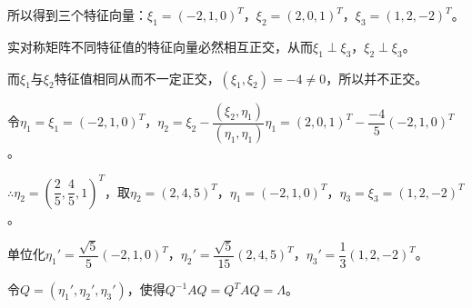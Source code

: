 \documentclass[UTF8, 12pt]{ctexart}
\begin{document}
所以得到三个特征向量：$\xi_1=(-2,1,0)^T$，$\xi_2=(2,0,1)^T$，$\xi_3=(1,2,-2)^T$。

实对称矩阵不同特征值的特征向量必然相互正交，从而$\xi_1\perp\xi_3$，$\xi_2\perp\xi_3$。

而$\xi_1$与$\xi_2$特征值相同从而不一定正交，$(\xi_1,\xi_2)=-4\neq0$，所以并不正交。

令$\eta_1=\xi_1=(-2,1,0)^T$，$\eta_2=\xi_2-\dfrac{(\xi_2,\eta_1)}{(\eta_1,\eta_1)}\eta_1=(2,0,1)^T-\dfrac{-4}{5}(-2,1,0)^T$。

$\therefore\eta_2=\left(\dfrac{2}{5},\dfrac{4}{5},1\right)^T$，取$\eta_2=(2,4,5)^T$，$\eta_1=(-2,1,0)^T$，$\eta_3=\xi_3=(1,2,-2)^T$。

单位化$\eta_1'=\dfrac{\sqrt{5}}{5}(-2,1,0)^T$，$\eta_2'=\dfrac{\sqrt{5}}{15}(2,4,5)^T$，$\eta_3'=\dfrac{1}{3}(1,2,-2)^T$。

令$Q=(\eta_1',\eta_2',\eta_3')$，使得$Q^{-1}AQ=Q^TAQ=\Lambda$。
\end{document}
